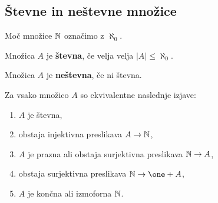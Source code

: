 \subsection{Števne in neštevne množice}

Moč množice $\mathbb{N}$ označimo z $\aleph_0$.

\begin{definicija}
  Množica $A$ je \textbf{števna}, če velja velja $|A| \leq \aleph_0$.
\end{definicija}

\begin{definicija}
  Množica $A$ je \textbf{neštevna}, če ni števna.
\end{definicija}

\begin{izrek}
  Za vsako množico $A$ so ekvivalentne naslednje izjave:
  \begin{enumerate}
  \item $A$ je števna,
  \item obstaja injektivna preslikava $A \to \mathbb{N}$,
  \item $A$ je prazna ali obstaja surjektivna preslikava $\mathbb{N} \to A$,
  \item obstaja surjektivna preslikava $\NN \to \one + A$,
  \item $A$ je končna ali izmoforna $\mathbb{N}$.
  \end{enumerate}
\end{izrek}


